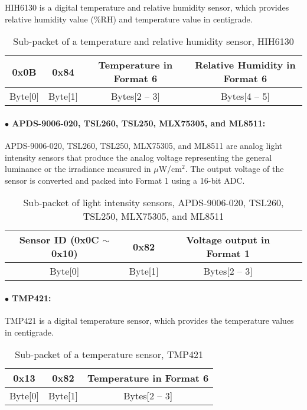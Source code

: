 HIH6130 is a digital temperature and relative humidity sensor, which provides
relative humidity value (\%RH) and temperature value in centigrade.
\\

\begin{table}[h!]
    \centering
    \caption{Sub-packet of a temperature and relative humidity sensor, HIH6130}
    \begin{tabular}{|c|c|c|c|}
        \hline
        \rowcolor{black!8}
        \textbf{0x0B} & \textbf{0x84} & \textbf{Temperature in Format 6} & \textbf{Relative Humidity in Format 6}\\
        \hline
        Byte[0] & Byte[1] & Bytes[2 -- 3] & Bytes[4 -- 5] \\ \hline
    \end{tabular}
\end{table}


\paragraph{$\bullet$ APDS-9006-020, TSL260, TSL250, MLX75305, and ML8511:}

APDS-9006-020, TSL260, TSL250, MLX75305, and ML8511 are analog light intensity sensors that produce the analog voltage 
representing the general luminance or the irradiance measured in $\mu$W/cm$^2$. The output voltage of the sensor
is converted and packed into Format 1 using a 16-bit ADC.

\begin{table}[h!]
    \centering
    \caption{Sub-packet of light intensity sensors, APDS-9006-020, TSL260, TSL250, MLX75305, and ML8511}
    \begin{tabular}{|c|c|c|c|}
        \hline
        \rowcolor{black!8}
        \textbf{Sensor ID} (0x0C $\sim$ 0x10) & \textbf{0x82} & \textbf{Voltage output in Format 1}\\
        \hline
        Byte[0] & Byte[1] & Bytes[2 -- 3] \\ \hline
    \end{tabular}
\end{table}


\paragraph{$\bullet$ TMP421:}
TMP421 is a digital temperature sensor, which provides the temperature values
in centigrade.

\begin{table}[h!]
    \centering
    \caption{Sub-packet of a temperature sensor, TMP421}
    \begin{tabular}{|c|c|c|}
        \hline
        \rowcolor{black!8}
        \textbf{0x13} & \textbf{0x82} & \textbf{Temperature in Format 6}\\
        \hline
        Byte[0] & Byte[1] & Bytes[2 -- 3] \\ \hline
    \end{tabular}
\end{table}


